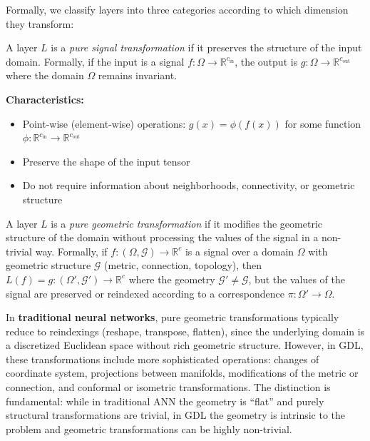 Formally, we classify layers into three categories according to which dimension they transform:

\begin{definition}\label{def:signal_transform}
	A layer $L$ is a \textit{pure signal transformation} if it preserves the structure of the input domain. Formally, if the input is a signal $f: \Omega \to \mathbb{R}^{c_{\text{in}}}$, the output is $g: \Omega \to \mathbb{R}^{c_{\text{out}}}$ where the domain $\Omega$ remains invariant.

	\textbf{Characteristics:}
	\begin{itemize}
		\item Point-wise (element-wise) operations: $g(x) = \phi(f(x))$ for some function $\phi: \mathbb{R}^{c_{\text{in}}} \to \mathbb{R}^{c_{\text{out}}}$
		\item Preserve the shape of the input tensor
		\item Do not require information about neighborhoods, connectivity, or geometric structure
	\end{itemize}
\end{definition}

\begin{definition}\label{def:geometry_transform}
	A layer $L$ is a \textit{pure geometric transformation} if it modifies the geometric structure of the domain without processing the values of the signal in a non-trivial way. Formally, if $f: (\Omega, \mathcal{G}) \to \mathbb{R}^c$ is a signal over a domain $\Omega$ with geometric structure $\mathcal{G}$ (metric, connection, topology), then $L(f) = g: (\Omega', \mathcal{G}') \to \mathbb{R}^c$ where the geometry $\mathcal{G}' \neq \mathcal{G}$, but the values of the signal are preserved or reindexed according to a correspondence $\pi: \Omega' \to \Omega$.
\end{definition}

In \textbf{traditional neural networks}, pure geometric transformations typically reduce to reindexings (reshape, transpose, flatten), since the underlying domain is a discretized Euclidean space without rich geometric structure. However, in \gls{GDL}, these transformations include more sophisticated operations: changes of coordinate system, projections between manifolds, modifications of the metric or connection, and conformal or isometric transformations. The distinction is fundamental: while in traditional \gls{ANN} the geometry is ``flat'' and purely structural transformations are trivial, in \gls{GDL} the geometry is intrinsic to the problem and geometric transformations can be highly non-trivial.


